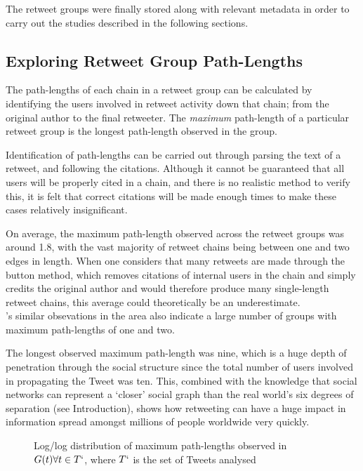 The retweet groups were finally stored along with relevant metadata in order to carry out the studies described in the following sections.


\subsection{Exploring Retweet Group Path-Lengths}
The path-lengths of each chain in a retweet group can be calculated by identifying the users involved in retweet activity down that chain; from the original author to the final retweeter. The \textit{maximum} path-length of a particular retweet group is the longest path-length observed in the group.

Identification of path-lengths can be carried out through parsing the text of a retweet, and following the citations. Although it cannot be guaranteed that all users will be properly cited in a chain, and there is no realistic method to verify this, it is felt that correct citations will be made enough times to make these cases relatively insignificant.

On average, the maximum path-length observed across the retweet groups was around 1.8, with the vast majority of retweet chains being between one and two edges in length. When one considers that many retweets are made through the button method, which removes citations of internal users in the chain and simply credits the original author and would therefore produce many single-length retweet chains, this average could theoretically be an underestimate.\\
\cite{kwak10}'s similar obsevations in the area also indicate a large number of groups with maximum path-lengths of one and two.

The longest observed maximum path-length was nine, which is a huge depth of penetration through the social structure since the total number of users involved in propagating the Tweet was ten. This, combined with the knowledge that social networks can represent a `closer' social graph than the real world's six degrees of separation (see Introduction), shows how retweeting can have a huge impact in information spread amongst millions of people worldwide very quickly.

\begin{figure}[h]
\centering
    \caption{Log/log distribution of maximum path-lengths observed in $G(t) \forall t \in T`$, where $T`$ is the set of Tweets analysed}
    \label{fig:pathlength-distribution}
\end{figure}


